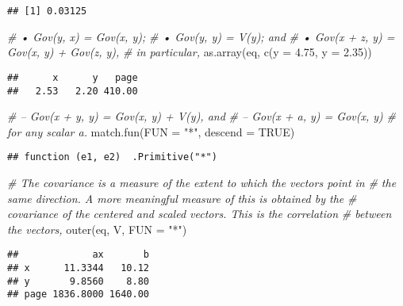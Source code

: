 \documentclass[
]{article}
\newenvironment{Shaded}{\begin{snugshade}}{\end{snugshade}}
\newcommand{\AttributeTok}[1]{\textcolor[rgb]{0.77,0.63,0.00}{#1}}
\newcommand{\CommentTok}[1]{\textcolor[rgb]{0.56,0.35,0.01}{\textit{#1}}}
\newcommand{\ConstantTok}[1]{\textcolor[rgb]{0.00,0.00,0.00}{#1}}
\newcommand{\FloatTok}[1]{\textcolor[rgb]{0.00,0.00,0.81}{#1}}
\newcommand{\FunctionTok}[1]{\textcolor[rgb]{0.00,0.00,0.00}{#1}}
\newcommand{\NormalTok}[1]{#1}
\newcommand{\StringTok}[1]{\textcolor[rgb]{0.31,0.60,0.02}{#1}}
\begin{document}
\begin{verbatim}
## [1] 0.03125
\end{verbatim}

\begin{Shaded}
\begin{Highlighting}[]
\CommentTok{\# • Gov(y, x) = Gov(x, y);}
\CommentTok{\# • Gov(y, y) = V(y); and}
\CommentTok{\# • Gov(x + z, y) = Gov(x, y) + Gov(z, y),}
\CommentTok{\# in particular,}
\FunctionTok{as.array}\NormalTok{(eq, }\FunctionTok{c}\NormalTok{(}\AttributeTok{y =} \FloatTok{4.75}\NormalTok{, }\AttributeTok{y =} \FloatTok{2.35}\NormalTok{))}
\end{Highlighting}
\end{Shaded}

\begin{verbatim}
##      x      y   page 
##   2.53   2.20 410.00
\end{verbatim}

\begin{Shaded}
\begin{Highlighting}[]
\CommentTok{\# – Gov(x + y, y) = Gov(x, y) + V(y), and}
\CommentTok{\# – Gov(x + a, y) = Gov(x, y)}
\CommentTok{\# for any scalar a.}
\FunctionTok{match.fun}\NormalTok{(}\AttributeTok{FUN =} \StringTok{"*"}\NormalTok{, }\AttributeTok{descend =} \ConstantTok{TRUE}\NormalTok{)}
\end{Highlighting}
\end{Shaded}

\begin{verbatim}
## function (e1, e2)  .Primitive("*")
\end{verbatim}

\begin{Shaded}
\begin{Highlighting}[]
\CommentTok{\# The covariance is a measure of the extent to which the vectors point in}
\CommentTok{\# the same direction. A more meaningful measure of this is obtained by the}
\CommentTok{\# covariance of the centered and scaled vectors. This is the correlation }
\CommentTok{\# between the vectors,}
\FunctionTok{outer}\NormalTok{(eq, V, }\AttributeTok{FUN =} \StringTok{"*"}\NormalTok{)}
\end{Highlighting}
\end{Shaded}

\begin{verbatim}
##             ax       b
## x      11.3344   10.12
## y       9.8560    8.80
## page 1836.8000 1640.00
\end{verbatim}
\end{document}
